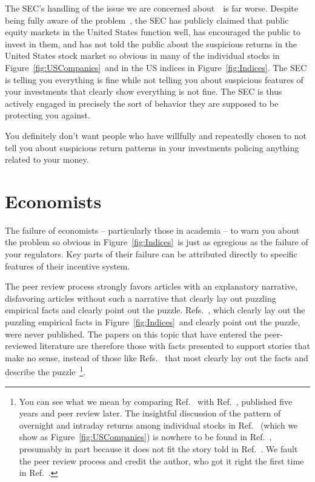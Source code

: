 \documentclass[twocolumn,twoside,prd,floatfix,letterpaper]{revtex4}
\def \FigMain {Figure~\ref{fig:Indices}}
\def \FigIndices {Figure~\ref{fig:Indices}}
\def \FigUSCompanies {Figure~\ref{fig:USCompanies}}
\def \citeKnuteson {\cite{knuteson2016,knuteson2018,knuteson2019,knuteson2020,knuteson2021}}
\begin{document}
The SEC's handling of the issue we are concerned about~\citeKnuteson\ is far worse.  Despite being fully aware of the problem~\cite{knuteson2021}, the SEC has publicly claimed that public equity markets in the United States function well, has encouraged the public to invest in them, and has not told the public about the suspicious returns in the United States stock market so obvious in many of the individual stocks in \FigUSCompanies\ and in the US indices in \FigIndices.  The SEC is telling you everything is fine while not telling you about suspicious features of your investments that clearly show everything is not fine.  The SEC is thus actively engaged in precisely the sort of behavior they are supposed to be protecting you against.

You definitely don't want people who have willfully and repeatedly chosen to not tell you about suspicious return patterns in your investments policing anything related to your money.


\section{Economists\label{sec:Economists}}

The failure of economists -- particularly those in academia -- to warn you about the problem so obvious in \FigMain\ is just as egregious as the failure of your regulators.  Key parts of their failure can be attributed directly to specific features of their incentive system.

The peer review process strongly favors articles with an explanatory narrative, disfavoring articles without such a narrative that clearly lay out puzzling empirical facts and clearly point out the puzzle.  Refs.~\cite{cooper2008return,lachance2015night}, which clearly lay out the puzzling empirical facts in \FigMain\ and clearly point out the puzzle, were never published.  The papers on this topic that have entered the peer-reviewed literature are therefore those with facts presented to support stories that make no sense, instead of those like Refs.~\cite{cooper2008return,lachance2015night} that most clearly lay out the facts and describe the puzzle~\footnote{You can see what we mean by comparing Ref.~\cite{lachance2015night} with Ref.~\cite{lachance2020etfs}, published five years and peer review later.  The insightful discussion of the pattern of overnight and intraday returns among individual stocks in Ref.~\cite{lachance2015night} (which we show as \FigUSCompanies) is nowhere to be found in Ref.~\cite{lachance2020etfs}, presumably in part because it does not fit the story told in Ref.~\cite{lachance2020etfs}.  We fault the peer review process and credit the author, who got it right the first time in Ref.~\cite{lachance2015night}.}.
\end{document}

